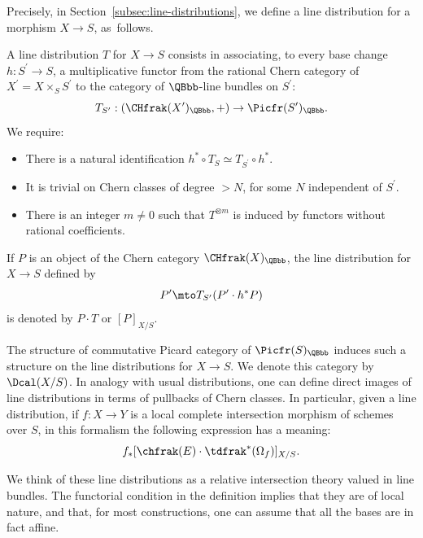 Precisely, in Section~\ref{subsec:line-distributions}, we define a line distribution for a morphism $X\to S$, as~follows.

\begin{definition-intro}

A line distribution $T$ for $X\to S$ consists in associating, to every base change $h: S^{\prime}\to S$, a multiplicative functor from the rational Chern category of $X^{\prime}=X\times_{S}S^{\prime}$ to the category of $\QBbb$-line bundles on $S^{\prime}$:
\begin{displaymath}
T_{S^{\prime}} : (\CHfrak(X^{\prime})_\QBbb,+) \to \Picfr(S^{\prime})_{\QBbb}.
\end{displaymath}
We require:
\begin{itemize}
\item There is a natural identification $h^{\ast}\circ T_{S} \simeq T_{S^{\prime}}\circ h^{\ast}$.
\item It is trivial on Chern classes of degree $> N$, for some $N$ independent of $S^{\prime}$.
\item There is an integer $m\neq 0$ such that $T^{\otimes m}$ is induced by functors without rational coefficients.

\end{itemize}
If $P$ is an object of the Chern category $\CHfrak(X)_\QBbb$, the line distribution for $X\to S$ defined by
\begin{displaymath}
P^{\prime} \mto T_{S^{\prime}}(P^{\prime} \cdot h^\ast P)
\end{displaymath}
is denoted by $P\cdot T$ or $[P]_{X/S}$.
\end{definition-intro}

The structure of commutative Picard category of $\Picfr(S)_{\QBbb}$ induces such a structure on the line distributions for $X\to S$. We denote this category by $\Dcal(X/S)$. In analogy with usual distributions, one can define direct images of line distributions in terms of pullbacks of Chern classes. In particular, given a line distribution, if $f: X\to Y$ is a local complete intersection morphism of schemes over $S$, in this formalism the following expression has a meaning:
\begin{equation}\label{eq:introdirectimage}
f_\ast [\chfrak(E) \cdot \tdfrak^{\ast} (\Omega_f)]_{X/S}.
\end{equation}

We think of these line distributions as a relative intersection theory valued in line bundles. The functorial condition in the definition implies that they are of local nature, and that, for most constructions, one can assume that all the bases are in fact affine.

